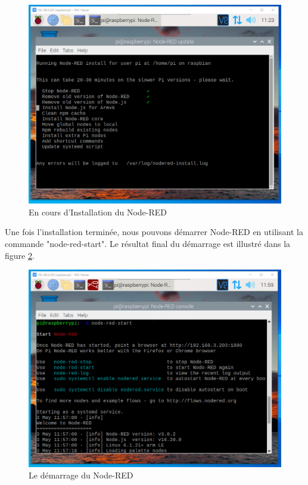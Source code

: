 \begin{figure}[H]
 \centering
    \includegraphics[width=13cm]{Images/NodeRedInstall2.png}
    \caption{En cours d'Installation du Node-RED}
    \label{Chap4.3.3}
\end{figure}    

Une fois l'installation terminée, nous pouvons démarrer Node-RED en utilisant la commande "node-red-start". Le résultat final du démarrage est illustré dans la figure \ref{Chap4.3.5}.

\begin{figure}[H]
 \centering
    \includegraphics[width=15cm]{Images/NodeRedStart1.png}
    \caption{Le démarrage du Node-RED}
    \label{Chap4.3.5}
\end{figure}    

